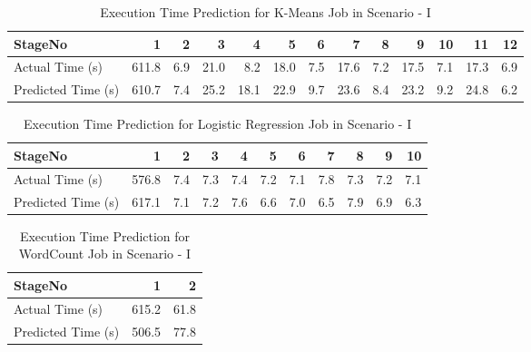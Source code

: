 \begin{table*}[!htb]
\renewcommand{\arraystretch}{1.3}
\caption{Execution Time Prediction for K-Means Job in Scenario - I}
\label{bkm}
\centering
\begin{tabular}{l|r|r|r|r|r|r|r|r|r|r|r|r}
\hline
\bfseries StageNo & \bfseries 1 & \bfseries 2 & \bfseries 3 & \bfseries 4 & \bfseries 5 & \bfseries 6 & \bfseries 7 & \bfseries 8 & \bfseries 9 & \bfseries 10 & \bfseries 11 & \bfseries 12\\
\hline \hline
Actual Time (s)
&611.8
&6.9
&21.0
&8.2
&18.0
&7.5
&17.6
&7.2
&17.5
&7.1
&17.3
&6.9 \\
\hline
Predicted Time (s) 
&610.7
&7.4
&25.2
&18.1
&22.9
&9.7
&23.6
&8.4
&23.2
&9.2
&24.8
&6.2 \\
\hline
\end{tabular}
\end{table*}

\begin{table*}[!htb]
\renewcommand{\arraystretch}{1.3}
\caption{Execution Time Prediction for Logistic Regression Job in Scenario - I}
\label{blr}
\centering
\begin{tabular}{l|r|r|r|r|r|r|r|r|r|r}
\hline
\bfseries StageNo & \bfseries 1 & \bfseries 2 & \bfseries 3 & \bfseries 4 & \bfseries 5 & \bfseries 6 & \bfseries 7 & \bfseries 8 & \bfseries 9 & \bfseries 10 \\
\hline \hline
Actual Time (s)
&576.8
&7.4
&7.3
&7.4
&7.2
&7.1
&7.8
&7.3
&7.2
&7.1 \\
\hline
Predicted Time (s) 
&617.1
&7.1
&7.2
&7.6
&6.6
&7.0
&6.5
&7.9
&6.9
&6.3
\\
\hline
\end{tabular}
\end{table*}


\begin{table*}[!htb]
\renewcommand{\arraystretch}{1.3}
\caption{Execution Time Prediction for WordCount Job in Scenario - I}
\label{bwc}
\centering
\begin{tabular}{l|r|r}
\hline
\bfseries StageNo & \bfseries 1 & \bfseries 2 \\
\hline \hline
Actual Time (s)
& 615.2
& 61.8 \\
\hline
Predicted Time (s) 
& 506.5
& 77.8 \\
\hline
\end{tabular}
\end{table*}



